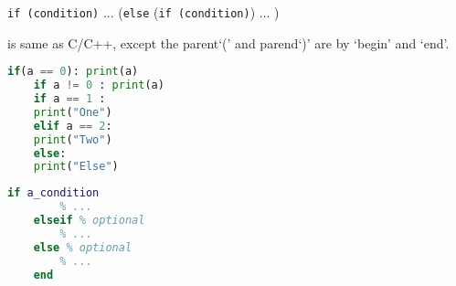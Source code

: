 
\verb`if (condition)` ... (\verb`else` (\verb`if (condition)`) ... )

 is same as C/C++, except the parent`(' and parend`)' are by `begin' and `end'.


\begin{lstlisting}[language=Python]
	if(a == 0): print(a)
	if a != 0 : print(a)
	if a == 1 :
	print("One")
	elif a == 2:
	print("Two")
	else:
	print("Else")
\end{lstlisting}

\begin{lstlisting}[language=MATLAB]
	if a_condition
		% ...
	elseif % optional
		% ...
	else % optional
		% ...
	end
\end{lstlisting}


